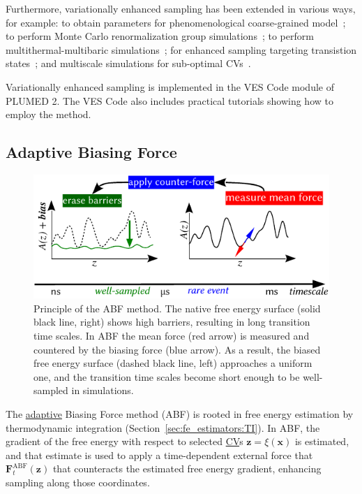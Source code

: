 \documentclass[9pt,review]{livecoms}
\newcommand{\vx}{\mathbf{x}}
\newcommand{\vz}{\mathbf{z}}
\newcommand{\vF}{\mathbf{F}}
\begin{document}
Furthermore, variationally enhanced sampling has been extended in various ways, for example:
to obtain parameters for phenomenological coarse-grained model~\cite{Invernizzi-PNAS-2017};
to perform Monte Carlo renormalization group simulations~\cite{Wu_VES-RGMC_PRL2017,Wu_VES-RGMC_PRE2019,Wu_VES-RGMC_PRL2020};
to perform multithermal-multibaric simulations~\cite{Piaggi_MultiVES_2019};
for enhanced sampling targeting transistion states~\cite{Debnath_VES-TS_2019}; and
multiscale simulations for sub-optimal CVs~\cite{Invernizzi_VES_DelteF_2019}.

Variationally enhanced sampling is implemented in the VES Code module of PLUMED 2. The VES Code also includes practical tutorials showing how to employ the method.




\subsection{Adaptive Biasing Force}
\label{sec:ABF}

\begin{figure}
    \centering
    \includegraphics{Figures/abf_new.pdf}
    \caption{Principle of the ABF method. The native free energy surface (solid black line, right) shows high barriers, resulting in long transition time scales.
    In ABF the mean force (red arrow) is measured and countered by the biasing force (blue arrow). As a result, the biased free energy surface (dashed black line, left) approaches a uniform one, and the transition time scales become short enough to be well-sampled in simulations.}
    \label{fig:ABF}
\end{figure}

The \hyperlink{ref:Adaptive} {adaptive} Biasing Force method (ABF) is rooted in free energy estimation by thermodynamic integration (Section~\ref{sec:fe_estimators:TI}).
In ABF, the gradient of the free energy with respect to selected \hyperlink{ref:CV} {CV}s $\vz = \xi(\vx)$ is estimated, and that estimate is used to apply a time-dependent external force that $\vF^\mathrm{ABF}_t(\vz)$ that counteracts the estimated free energy gradient, enhancing sampling along those coordinates.
\end{document}
